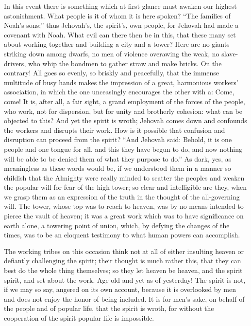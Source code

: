 \documentclass[12pt,a4paper,openany]{book}
\newcommand{\opage}[1]{\marginnote{\footnotesize\textit{[#1]}}}
\begin{document}
In this event there is something which at first
glance must awaken our highest astonishment. What
people is it of whom it is here spoken? ``The families of Noah's sons;'' thus Jehovah's,
the spirit's, own people, for Jehovah
had made a covenant with Noah. What evil can
there then be in this, that these many set about working
together and building a city and a tower? Here
are no giants striking down among dwarfs,
no men of violence overawing the weak, no
\setcounter{footnote}{0}%
\opage{13}slave-drivers, who whip the bondmen to gather straw
and make bricks. On the contrary! All goes so evenly, so
briskly and peacefully, that the immense multitude of busy hands
makes the impression of a great, harmonious workers' association,
in which the one unceasingly encourages the other with
a: Come, come! It is, after all, a fair sight, a grand
employment of the forces of the people, who work, not for
dispersion, but for unity and brotherly cohesion:
what can be objected to this? And yet the spirit is
wroth; Jehovah comes down and confounds the workers
and disrupts their work. How is it possible
that confusion and disruption can proceed from the spirit?
``And Jehovah said: Behold, it is one people and one tongue
for all, and this they have begun to do, and
now nothing will be able to be denied them of what they purpose
to do.'' As dark, yes, as meaningless as these
words would be, if we understood them in a manner so
childish that the Almighty were really minded to scatter the peoples and weaken
the popular will for fear of the high tower; so clear and
intelligible are they, when we grasp them as an expression of
the truth in the thought of the all-governing will. The tower,
whose top was to reach to heaven, was by no means
intended to pierce the vault of heaven; it
was a great work which was to have significance on earth alone,
a towering point of union, which, by
defying the changes of the times, was to be an eloquent
testimony to what human powers can accomplish.

The working tribes on this occasion think
not at all of either insulting heaven or
defiantly challenging the spirit; their thought is much rather
this, that they can best do the whole thing themselves; so
\setcounter{footnote}{0}%
\opage{14}they let heaven be heaven, and the spirit spirit, and set about
the work. Age-old and yet as of yesterday!
The spirit is not, if we may so say, angered
on its own account, because it is overlooked by men
and does not enjoy the honor of being included. It is
for men's sake, on behalf of the people and of popular life,
that the spirit is wroth, for without the cooperation of the spirit
popular life is impossible.
\end{document}
